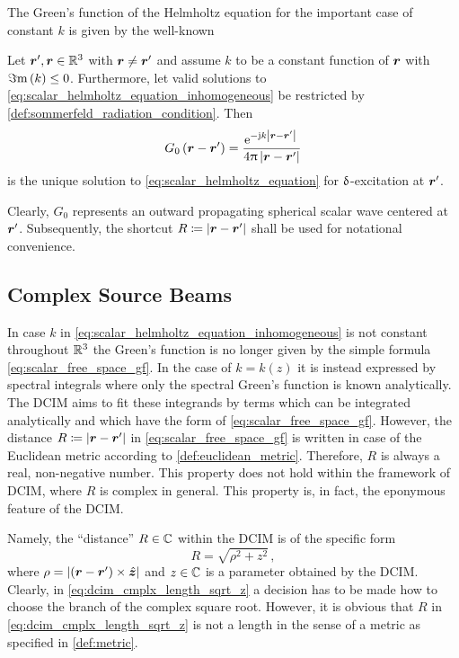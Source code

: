The Green's function of the Helmholtz equation for the important case of
constant $k$ is given by the well-known \cite{Jackson2013}
\begin{corollary}
	Let $\rsrc, \robs \in \R^3$ with $\robs \neq \rsrc$ and assume
	$k$ to be a constant function of $\robs$ with $\Im\mathrm{m}\left(k\right) \leq 0$.
	Furthermore, let valid solutions to
	\eqref{eq:scalar_helmholtz_equation_inhomogeneous} be restricted by
	\cref{def:sommerfeld_radiation_condition}.
	Then
	\begin{equation}\label{eq:scalar_free_space_gf}
		G_0 \left( \rdiff \right) =
		\frac{\exp{-\im k \abs{\rdiff}}}{4\pi \abs{\rdiff}}
	\end{equation}
	is the unique solution to \eqref{eq:scalar_helmholtz_equation} for
	$\operatorname{\updelta}$-excitation at $\rsrc$.
\end{corollary}

Clearly, $G_0$ represents an outward propagating spherical scalar wave 
centered at $\rsrc$.
Subsequently, the shortcut $R \coloneqq \abs{\rdiff}$ shall be used for
notational convenience.







\subsection{Complex Source Beams}

In case $k$ in \eqref{eq:scalar_helmholtz_equation_inhomogeneous} is not
constant throughout $\mathbb{R}^3$ the Green's function is no longer given by the
simple formula \eqref{eq:scalar_free_space_gf}.
In the case of $k = k\left(z\right)$ it is instead expressed by spectral
integrals where only the spectral Green's function is known analytically.
The \ac{DCIM} aims to fit these integrands by terms which can be integrated
analytically and which have the form of \eqref{eq:scalar_free_space_gf}.
However, the distance $R \coloneqq \abs{\rdiff}$ in 
\eqref{eq:scalar_free_space_gf} is written in case of the Euclidean metric
according to \cref{def:euclidean_metric}.
Therefore, $R$ is always a real, non-negative number.
This property does not hold within the framework of \ac{DCIM}, where $R$
is complex in general.
This property is, in fact, the eponymous feature of the \ac{DCIM}.

Namely, the \enquote{distance} $R \in \mathbb{C}$ within the \ac{DCIM} is of the
specific form
\begin{equation}\label{eq:dcim_cmplx_length_sqrt_z}
	R = \sqrt{\rho^2 + z^2}
	\, ,
\end{equation}
where $\rho = \abs{\left(\rdiff\right) \times \uv{z}}$ and $z \in \mathbb{C}$ is a
parameter obtained by the \ac{DCIM}.
Clearly, in \eqref{eq:dcim_cmplx_length_sqrt_z} a decision has to be made how
to choose the branch of the complex square root.
However, it is obvious that $R$ in \eqref{eq:dcim_cmplx_length_sqrt_z} is not
a length in the sense of a metric as specified in \cref{def:metric}.

